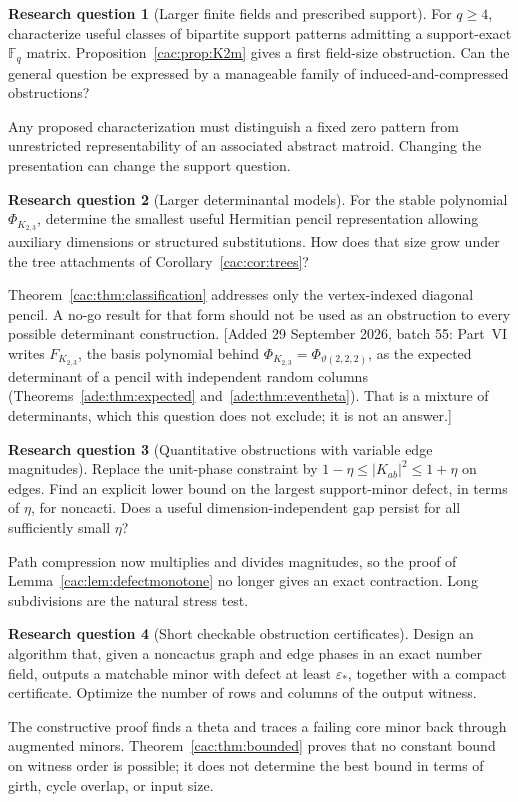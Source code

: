\documentclass[11pt]{article}
\numberwithin{equation}{section}
\theoremstyle{definition}
\newtheorem{question}{Research question}%
\newcommand{\F}{\mathbb F}
\newcommand{\epsstar}{\varepsilon_*}
\begin{document}
\begin{question}[Larger finite fields and prescribed support]
For $q\ge4$, characterize useful classes of bipartite support patterns admitting a support-exact $\F_q$ matrix. Proposition~\ref{cac:prop:K2m} gives a first field-size obstruction. Can the general question be expressed by a manageable family of induced-and-compressed obstructions?
\end{question}
Any proposed characterization must distinguish a fixed zero pattern from unrestricted representability of an associated abstract matroid. Changing the presentation can change the support question.

\begin{question}[Larger determinantal models]\label{ade:hq:detmodels}%
For the stable polynomial $\Phi_{K_{2,3}}$, determine the smallest useful Hermitian pencil representation allowing auxiliary dimensions or structured substitutions. How does that size grow under the tree attachments of Corollary~\ref{cac:cor:trees}?
\end{question}
Theorem~\ref{cac:thm:classification} addresses only the vertex-indexed diagonal pencil. A no-go result for that form should not be used as an obstruction to every possible determinant construction.
[Added 29 September 2026, batch 55: Part~VI writes $F_{K_{2,3}}$, the basis polynomial behind $\Phi_{K_{2,3}}=\Phi_{\vartheta(2,2,2)}$, as the expected determinant of a pencil with independent random columns (Theorems~\ref{ade:thm:expected} and~\ref{ade:thm:eventheta}). That is a mixture of determinants, which this question does not exclude; it is not an answer.]

\begin{question}[Quantitative obstructions with variable edge magnitudes]
Replace the unit-phase constraint by $1-\eta\le |K_{ab}|^2\le1+\eta$ on edges. Find an explicit lower bound on the largest support-minor defect, in terms of $\eta$, for noncacti. Does a useful dimension-independent gap persist for all sufficiently small $\eta$?
\end{question}
Path compression now multiplies and divides magnitudes, so the proof of Lemma~\ref{cac:lem:defectmonotone} no longer gives an exact contraction. Long subdivisions are the natural stress test.

\begin{question}[Short checkable obstruction certificates]
Design an algorithm that, given a noncactus graph and edge phases in an exact number field, outputs a matchable minor with defect at least $\epsstar$, together with a compact certificate. Optimize the number of rows and columns of the output witness.
\end{question}
The constructive proof finds a theta and traces a failing core minor back through augmented minors. Theorem~\ref{cac:thm:bounded} proves that no constant bound on witness order is possible; it does not determine the best bound in terms of girth, cycle overlap, or input size.
\end{document}
